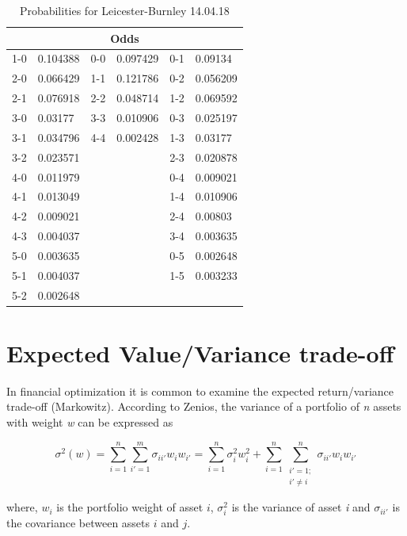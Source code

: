\begin{table}[H]
\centering
\caption{Probabilities for Leicester-Burnley 14.04.18}
\label{Prob.Lei-Bur}
\begin{tabular}{|ll|ll|ll|}
\multicolumn{6}{c}{Odds}                         \\
\hline
1-0 & 0.104388 & 0-0 & 0.097429 & 0-1 & 0.09134  \\
2-0 & 0.066429 & 1-1 & 0.121786 & 0-2 & 0.056209 \\
2-1 & 0.076918 & 2-2 & 0.048714 & 1-2 & 0.069592 \\
3-0 & 0.03177  & 3-3 & 0.010906 & 0-3 & 0.025197 \\
3-1 & 0.034796 & 4-4 & 0.002428 & 1-3 & 0.03177  \\
3-2 & 0.023571 &     &          & 2-3 & 0.020878 \\
4-0 & 0.011979 &     &          & 0-4 & 0.009021 \\
4-1 & 0.013049 &     &          & 1-4 & 0.010906 \\
4-2 & 0.009021 &     &          & 2-4 & 0.00803  \\
4-3 & 0.004037 &     &          & 3-4 & 0.003635 \\
5-0 & 0.003635 &     &          & 0-5 & 0.002648 \\
5-1 & 0.004037 &     &          & 1-5 & 0.003233 \\
5-2 & 0.002648 &     &          &     &         \\
\hline
\end{tabular}
\end{table}


\section{Expected Value/Variance trade-off}

In financial optimization it is common to examine the expected return/variance trade-off (Markowitz). According to Zenios, the variance of a portfolio of \textit{n} assets with weight \textit{w} can be expressed as 

\begin{equation}
    \sigma^2(w) = \sum_{i = 1}^{n}\sum_{i' = 1}^{m}\sigma_{ii'}w_iw_{i'} = \sum_{i = 1}^{n}\sigma_{i}^2w_i^2 + \sum_{i = 1}^{n}\sum_{\substack{i' = 1;\\ i' \neq i}}^{n}\sigma_{ii'}w_iw_{i'}
    \label{eq:port_var}
\end{equation}

where, $w_i$ is the portfolio weight of asset $i$, $\sigma_{i}^2$ is the variance of asset \textit{i} and $\sigma_{ii'}$ is the covariance between assets $i$ and $j$. \newpar

